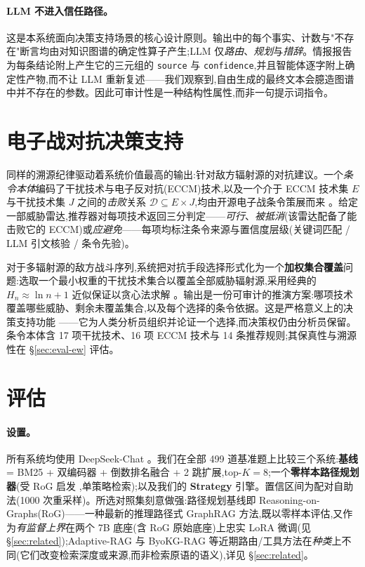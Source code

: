 \documentclass[11pt,a4paper]{article}
\begin{document}
\paragraph{LLM 不进入信任路径。}
这是本系统面向决策支持场景的核心设计原则。输出中的每个事实、计数与"不存在"断言均由对知识图谱的确定性算子产生;LLM 仅\emph{路由}、\emph{规划}与\emph{措辞}。情报报告为每条结论附上产生它的三元组的 \texttt{source} 与 \texttt{confidence},并且智能体逐字附上确定性产物,而不让 LLM 重新复述——我们观察到,自由生成的最终文本会臆造图谱中并不存在的参数。因此可审计性是一种结构性属性,而非一句提示词指令。

\section{电子战对抗决策支持}
\label{sec:ew}

同样的溯源纪律驱动着系统价值最高的输出:针对敌方辐射源的对抗建议。一个\emph{条令本体}编码了干扰技术与电子反对抗(ECCM)技术,以及一个介于 ECCM 技术集 $E$ 与干扰技术集 $J$ 之间的\emph{击败}关系 $\mathcal{D}\subseteq E\times J$,均由开源电子战条令策展而来 \citep{adamy2001ew101,schleher1999ew,zhang2023cognitiveew}。给定一部威胁雷达,推荐器对每项技术返回三分判定——\emph{可行}、\emph{被抵消}(该雷达配备了能击败它的 ECCM)或\emph{应避免}——每项均标注条令来源与置信度层级(关键词匹配 / LLM 引文核验 / 条令先验)。

对于多辐射源的敌方战斗序列,系统把对抗手段选择形式化为一个\textbf{加权集合覆盖}问题:选取一个最小权重的干扰技术集合以覆盖全部威胁辐射源,采用经典的 $H_n\!\approx\!\ln n + 1$ 近似保证以贪心法求解 \citep{chvatal1979setcover}。输出是一份可审计的推演方案:哪项技术覆盖哪些威胁、剩余未覆盖集合,以及每个选择的条令依据。这是严格意义上的决策支持功能 \citep{power2002dss}——它为人类分析员组织并论证一个选择,而决策权仍由分析员保留。条令本体含 17 项干扰技术、16 项 ECCM 技术与 14 条推荐规则;其保真性与溯源性在 \S\ref{sec:eval-ew} 评估。

\section{评估}
\label{sec:eval}

\paragraph{设置。} 所有系统均使用 DeepSeek-Chat \citep{deepseekv3_2024}。我们在全部 499 道基准题上比较三个系统:\textbf{基线} = BM25 \citep{robertson2009bm25} + 双编码器 \citep{xiao2024bge} + 倒数排名融合 \citep{cormack2009rrf} + 2 跳扩展,top-$K{=}8$;一个\textbf{零样本路径规划器}(受 RoG 启发 \citep{luo2024rog},单策略检索);以及我们的 \textbf{Strategy} 引擎。置信区间为配对自助法(1000 次重采样)。所选对照集刻意做强:路径规划基线即 Reasoning-on-Graphs(RoG)\citep{luo2024rog}——一种最新的推理路径式 GraphRAG 方法,既以零样本评估,又作为\emph{有监督上界}在两个 7B 底座(含 RoG 原始底座)上忠实 LoRA 微调(见 \S\ref{sec:related});Adaptive-RAG \citep{jeong2024adaptiverag} 与 ByoKG-RAG \citep{byokgrag2025} 等近期路由/工具方法在\emph{种类}上不同(它们改变检索深度或来源,而非检索原语的语义),详见 \S\ref{sec:related}。
\end{document}
